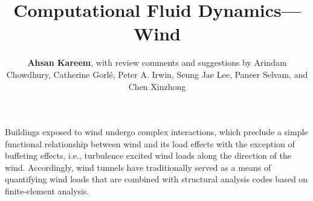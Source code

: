 %
%
%


%
%
%
%
%
%
%
%

\title{Computational Fluid Dynamics---Wind}
\author{
    \textbf{Ahsan Kareem},
    \newline
    with review comments and suggestions by Arindam Chowdhury, Catherine Gorlé, Peter A. Irwin, Seung Jae Lee, Paneer Selvam, and Chen Xinzhong
}
\tocauthor{}
%
%
\maketitle
\label{chapter:res_water}

Buildings exposed to wind undergo complex interactions, which preclude a simple functional relationship between wind and its load effects with the exception of buffeting effects, i.e., turbulence excited wind loads along the direction of the wind. Accordingly, wind tunnels have traditionally served as a means of quantifying wind loads that are combined with structural analysis codes based on finite-element analysis. 

